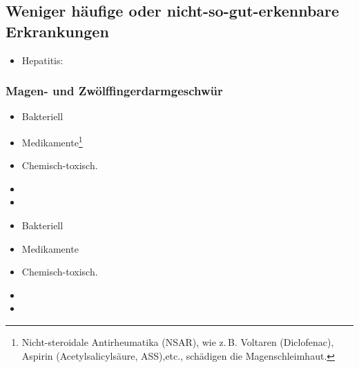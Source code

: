 % 
% 
% 
% 




\subsection{Weniger häufige oder nicht-so-gut-erkennbare Erkrankungen}


\begin{itemize}
    \item Hepatitis: 
\end{itemize}




\subsubsection{Magen- und Zwölffingerdarmgeschwür}



{
\begin{itemize}
    \item Bakteriell  \cite{Malfertheiner2004}
    \item Medikamente\footnote{Nicht-steroidale Antirheumatika (NSAR), wie z.\,B.
    Voltaren{\texttrademark} (Diclofenac), Aspirin{\texttrademark}
    (Acetylsalicylsäure, ASS),etc., schädigen die Magenschleimhaut.}
    \item Chemisch-toxisch.
    \item {}
    \item {}
\end{itemize}
}{
\begin{itemize}
    \item Bakteriell 
    \item Medikamente
    \item Chemisch-toxisch.
    \item {}
    \item {}
\end{itemize}
}{}{}{}

